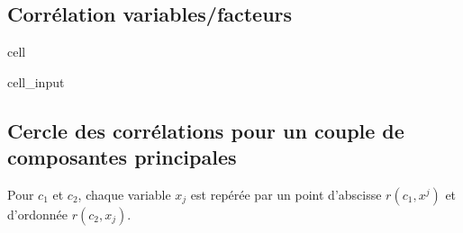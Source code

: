 \documentclass[letterpaper,10pt,english]{jupyterBook}
\begin{document}
\subsection{Corrélation variables/facteurs}
\label{\detokenize{acp:id3}}
\begin{sphinxuseclass}{cell}\begin{sphinxVerbatimInput}

\begin{sphinxuseclass}{cell_input}
\begin{sphinxVerbatim}[commandchars=\\\{\}]
  \PYG{p}{[}\PYG{p}{]}
   
    \PYG{p}{[}\PYG{p}{]}  \PYG{p}{[}\PYG{p}{]}
\end{sphinxVerbatim}

\end{sphinxuseclass}\end{sphinxVerbatimInput}

\end{sphinxuseclass}

\subsection{Cercle des corrélations pour un couple de composantes principales}
\label{\detokenize{acp:cercle-des-correlations-pour-un-couple-de-composantes-principales}}
\sphinxAtStartPar
Pour \(c_1\) et \(c_2\), chaque variable \(x_j\) est repérée par un point d’abscisse \(r(c_1,x^j)\) et d’ordonnée \(r(c_2, x_j)\).
\end{document}
